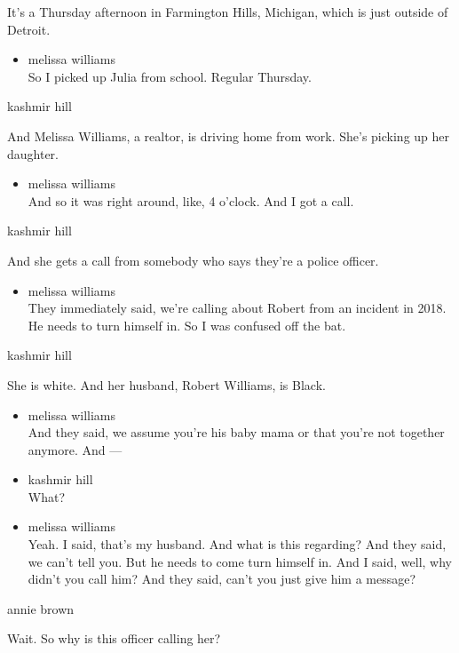 It's a Thursday afternoon in Farmington Hills, Michigan, which is just
outside of Detroit.

\begin{itemize}
\tightlist
\item
  melissa williams\\
  So I picked up Julia from school. Regular Thursday.
\end{itemize}

kashmir hill

And Melissa Williams, a realtor, is driving home from work. She's
picking up her daughter.

\begin{itemize}
\tightlist
\item
  melissa williams\\
  And so it was right around, like, 4 o'clock. And I got a call.
\end{itemize}

kashmir hill

And she gets a call from somebody who says they're a police officer.

\begin{itemize}
\tightlist
\item
  melissa williams\\
  They immediately said, we're calling about Robert from an incident in
  2018. He needs to turn himself in. So I was confused off the bat.
\end{itemize}

kashmir hill

She is white. And her husband, Robert Williams, is Black.

\begin{itemize}
\item
  melissa williams\\
  And they said, we assume you're his baby mama or that you're not
  together anymore. And ---
\item
  kashmir hill\\
  What?
\item
  melissa williams\\
  Yeah. I said, that's my husband. And what is this regarding? And they
  said, we can't tell you. But he needs to come turn himself in. And I
  said, well, why didn't you call him? And they said, can't you just
  give him a message?
\end{itemize}

annie brown

Wait. So why is this officer calling her?

